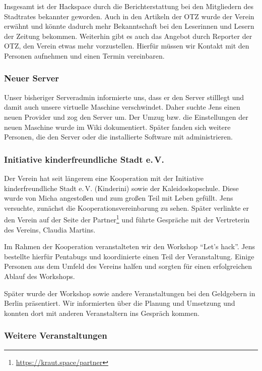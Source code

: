 \documentclass[ngerman]{scrartcl}
\begin{document}
Insgesamt ist der Hackspace durch die Berichterstattung bei den Mitgliedern des
Stadtrates bekannter geworden. Auch in den Artikeln der OTZ wurde der Verein
erwähnt und könnte dadurch mehr Bekanntschaft bei den Leserinnen und Lesern der
Zeitung bekommen. Weiterhin gibt es auch das Angebot durch Reporter der OTZ, den
Verein etwas mehr vorzustellen. Hierfür müssen wir Kontakt mit den Personen
aufnehmen und einen Termin vereinbaren.

\subsubsection{Neuer Server}

Unser bisheriger Serveradmin informierte uns, dass er den Server stilllegt und
damit auch unsere virtuelle Maschine verschwindet. Daher suchte Jens einen neuen
Provider und zog den Server um. Der Umzug bzw. die Einstellungen der neuen
Maschine wurde im Wiki dokumentiert. Später fanden sich weitere Personen, die
den Server oder die installierte Software mit administrieren.

\subsubsection{Initiative kinderfreundliche Stadt e.\,V.}

Der Verein hat seit längerem eine Kooperation mit der Initiative
kinderfreundliche Stadt e.\,V. (Kinderini) sowie der Kaleidoskopschule. Diese
wurde von Micha angestoßen und zum großen Teil mit Leben gefüllt. Jens
versuchte, zunächst die Kooperationsvereinbarung zu sehen. Später verlinkte er
den Verein auf der Seite der Partner\footnote{\url{https://kraut.space/partner}}
und führte Gespräche mit der Vertreterin des Vereins, Claudia Martins.

Im Rahmen der Kooperation veranstalteten wir den Workshop \enquote{Let's
  hack}. Jens bestellte hierfür Pentabugs und koordinierte einen Teil der
Veranstaltung. Einige Personen aus dem Umfeld des Vereins halfen und sorgten für
einen erfolgreichen Ablauf des Workshops.

Später wurde der Workshop sowie andere Veranstaltungen bei den Geldgebern in
Berlin präsentiert. Wir informierten über die Planung und Umsetzung und konnten
dort mit anderen Veranstaltern ins Gespräch kommen.

\subsubsection{Weitere Veranstaltungen}
\end{document}
